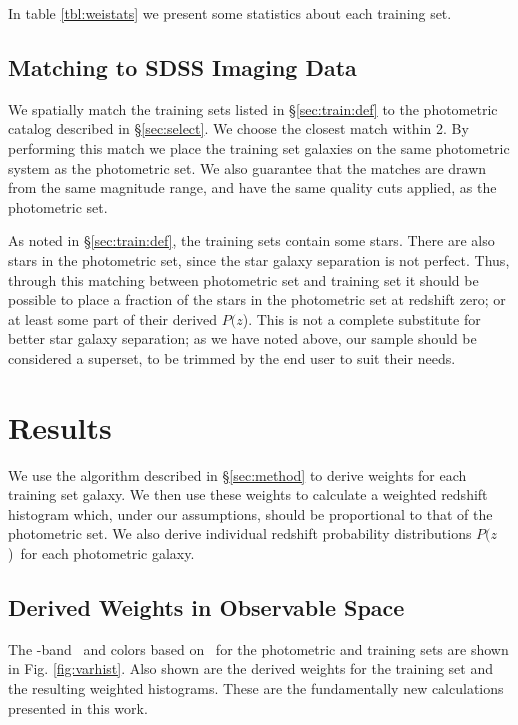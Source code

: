 \documentclass[12pt,preprint]{aastex}
\newcommand{\pofz}{$P(z$)}
\newcommand{\matchrad}{2\arcsec}
\begin{document}
In table \ref{tbl:weistats} we present some statistics about each training set.


\subsection{Matching to SDSS Imaging Data} \label{sec:train:match}

We spatially match the training sets listed in \S \ref{sec:train:def} to the
photometric catalog described in \S \ref{sec:select}.  We choose the closest
match within \matchrad.  By performing this match we place the training set
galaxies on the same photometric system as the photometric set.  We also
guarantee that the matches are drawn from the same magnitude range, and have
the same quality cuts applied, as the photometric set.

As noted in \S \ref{sec:train:def}, the training sets contain some stars.
There are also stars in the photometric set, since the star galaxy separation
is not perfect.  Thus, through this matching between photometric set and
training set it should be possible to place a fraction of the stars in the
photometric set at redshift zero; or at least some part of their derived \pofz.
This is not a complete substitute for better star galaxy separation; as we
have noted above, our sample should be considered a superset, to be
trimmed by the end user to suit their needs.

\section{Results} \label{sec:results}

We use the algorithm described in \S \ref{sec:method} to derive weights for
each training set galaxy.  We then use these weights to calculate a weighted
redshift histogram which, under our assumptions, should be proportional to that
of the photometric set.  We also derive individual redshift probability
distributions \pofz\ for each photometric galaxy.

\subsection{Derived Weights in Observable Space}

The \rmag-band \cmodelmag\ and colors based on \modelmag\ for the photometric
and training sets are shown in Fig. \ref{fig:varhist}.  Also shown are the
derived weights for the training set and the resulting weighted histograms.
These are the fundamentally new calculations presented in this work.
\end{document}
